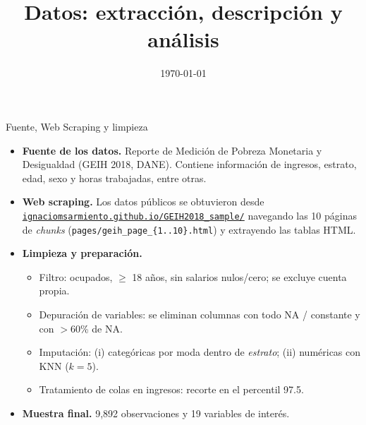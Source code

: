 \documentclass[10pt]{beamer}
\title{Datos: extracción, descripción y análisis}
\date[\textcolor{white}{\today}]{\today}
\begin{document}
\frame{\titlepage}

\begin{frame}{Fuente, Web Scraping y limpieza}
\begin{itemize}
  \item \textbf{Fuente de los datos.} Reporte de Medición de Pobreza Monetaria y Desigualdad (GEIH 2018, DANE). Contiene información de ingresos, estrato, edad, sexo y horas trabajadas, entre otras.
  \medskip
  \item \textbf{Web scraping.} Los datos públicos se obtuvieron desde 
  \href{https://ignaciomsarmiento.github.io/GEIH2018_sample/}{\texttt{ignaciomsarmiento.github.io/GEIH2018\_sample/}} 
  navegando las 10 páginas de \emph{chunks} (\texttt{pages/geih\_page\_\{1..10\}.html}) y extrayendo las tablas HTML.
  \medskip
  \item \textbf{Limpieza y preparación.} 
  \begin{itemize}
    \item Filtro: ocupados, $\ge$ 18 años, sin salarios nulos/cero; se excluye cuenta propia.
    \item Depuración de variables: se eliminan columnas con todo NA / constante y con $>$60\% de NA.
    \item Imputación: (i) categóricas por moda dentro de \textit{estrato}; (ii) numéricas con KNN ($k=5$).
    \item Tratamiento de colas en ingresos: recorte en el percentil 97.5.
  \end{itemize}
  \medskip
  \item \textbf{Muestra final.} 9{,}892 observaciones y 19 variables de interés.
\end{itemize}
\end{frame}
\end{document}
